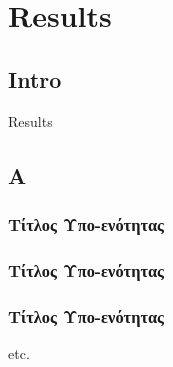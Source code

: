 \chapter{Results}
\label{chap4}

\section{Intro}
Results

\section{A}

\subsection{Τίτλος Υπο-ενότητας}

\subsection{Τίτλος Υπο-ενότητας}

\subsection{Τίτλος Υπο-ενότητας}

etc.
